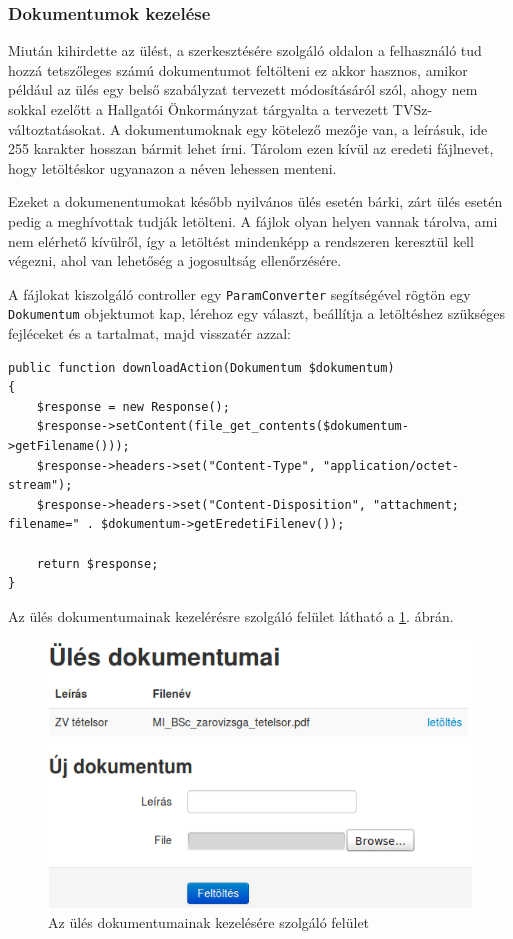 \documentclass[a4paper,12pt,oneside]{report}
\begin{document}
\subsubsection*{Dokumentumok kezelése}

Miután kihirdette az ülést, a szerkesztésére szolgáló oldalon a felhasználó tud hozzá tetszőleges számú dokumentumot feltölteni \textendash{} ez akkor hasznos, amikor például az ülés egy belső szabályzat tervezett módosításáról szól, ahogy nem sokkal ezelőtt a Hallgatói Önkormányzat tárgyalta a tervezett TVSz-változtatásokat. A dokumentumoknak egy kötelező mezője van, a leírásuk, ide 255 karakter hosszan bármit lehet írni. Tárolom ezen kívül az eredeti fájlnevet, hogy letöltéskor ugyanazon a néven lehessen menteni.

Ezeket a dokumenentumokat később nyilvános ülés esetén bárki, zárt ülés esetén pedig a meghívottak tudják letölteni. A fájlok olyan helyen vannak tárolva, ami nem elérhető kívülről, így a letöltést mindenképp a rendszeren keresztül kell végezni, ahol van lehetőség a jogosultság ellenőrzésére.

A fájlokat kiszolgáló controller egy {\tt ParamConverter} segítségével rögtön egy {\tt Dokumentum} objektumot kap, lérehoz egy választ, beállítja a letöltéshez szükséges fejléceket és a tartalmat, majd visszatér azzal:

\begin{lstlisting}
public function downloadAction(Dokumentum $dokumentum)
{
    $response = new Response();
    $response->setContent(file_get_contents($dokumentum->getFilename()));
    $response->headers->set("Content-Type", "application/octet-stream");
    $response->headers->set("Content-Disposition", "attachment; filename=" . $dokumentum->getEredetiFilenev());

    return $response;
}
\end{lstlisting}

Az ülés dokumentumainak kezelérésre szolgáló felület látható a \ref{fig:ules_dokumentumok}. ábrán.

\begin{figure}[h]
    \includegraphics[width=\textwidth]{ules_dokumentumok.png}
    \caption{Az ülés dokumentumainak kezelésére szolgáló felület}
    \label{fig:ules_dokumentumok}
\end{figure}
\end{document}
